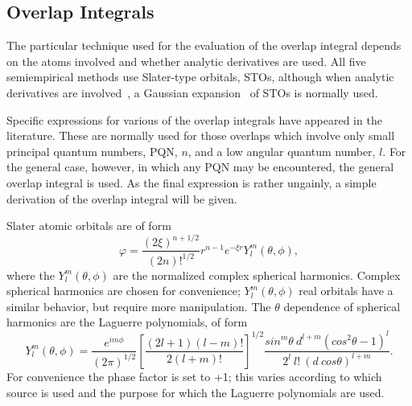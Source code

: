 \subsection{Overlap Integrals}
The particular technique used for the evaluation of the overlap integral
depends on the atoms involved and whether analytic derivatives are used. All
five semiempirical  methods use Slater-type orbitals,
STOs, although when analytic derivatives are involved~\cite{analyt}, a
Gaussian   expansion~\cite{analyt} of STOs is normally
used.

Specific expressions for various of the overlap integrals have appeared in the
literature. These are normally used for those overlaps which involve only small
principal quantum numbers, PQN, $n$, and a low angular quantum  number, $l$. For the general case, however, in which any
PQN may be encountered, the general overlap integral is used. As the final
expression is rather ungainly, a simple derivation of the overlap integral will
be given.

Slater atomic orbitals are of form\label{so}
$$
\varphi = \frac{(2\xi )^{n+1/2}}{(2n)!^{1/2}}r^{n-1}e^{-\xi r}Y_l^m(\theta ,\phi ),
$$
where the $Y_l^m(\theta ,\phi )$ are the normalized complex spherical
harmonics. Complex spherical harmonics are chosen for convenience;
$Y_l^m(\theta ,\phi )$ real orbitals have a similar behavior, but require more
manipulation. The $\theta$ dependence of
spherical harmonics are the Laguerre polynomials, of form
$$
Y_l^m(\theta ,\phi ) = \frac{e^{im\phi }}{(2\pi )^{1/2}}\left [\frac{(2l+1)(l-m)!}{2(l+m)!}\right ]^{1/2}
\frac{sin^m\theta\ d^{l+m}(cos^2\theta-1)^l}{2^l\ l!\ (d\ cos\theta)^{l+m}}.
$$
For convenience the phase factor is set to +1; this varies according to which
source is used and the purpose for which the Laguerre polynomials are used.

